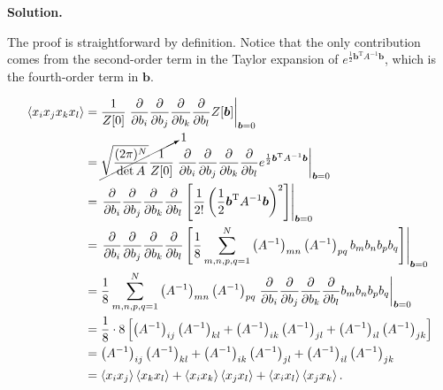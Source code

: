 \documentclass[11pt,a4paper]{article}
\newcounter{problem}
\newcounter{saveequation}
\newenvironment{solution}
{
	\par
	\setcounter{saveequation}{\value{equation}}
	\begingroup
	\setcounter{equation}{0}
	\renewcommand{\theequation}{\arabic{problem}.\arabic{equation}}
	\renewcommand{\theHequation}{sol.\arabic{problem}.\arabic{equation}}
	\noindent\textbf{Solution.}\quad
}
{
	\par
	\endgroup
	\setcounter{equation}{\value{saveequation}}
}
\begin{document}
	\begin{solution}
		The proof is straightforward by definition. Notice that the only contribution comes from the second-order term in the Taylor expansion of 
		$e^{\frac12 \boldsymbol{b}^\mathrm{T} A^{-1} \boldsymbol{b}}$, which is the fourth-order term in $\boldsymbol{b}$.
	\begin{finalanswer}
				\begin{equation}
				\label{fin:4}
				\begin{aligned}
					\braket{x_ix_jx_kx_l}
					&=\frac{1}{Z[0]}
					\left.
					\frac{\partial}{\partial b_i}
					\frac{\partial}{\partial b_j}
					\frac{\partial}{\partial b_k}
					\frac{\partial}{\partial b_l}
					Z[\boldsymbol{b}]
					\right|_{\boldsymbol{b}=0}\\
					&=\cancelto{1}{\sqrt{\frac{(2\pi)^N}{\det A}}\frac{1}{Z[0]}}
					\left.
					\frac{\partial}{\partial b_i}
					\frac{\partial}{\partial b_j}
					\frac{\partial}{\partial b_k}
					\frac{\partial}{\partial b_l}
					e^{\frac12 \boldsymbol{b}^{\mathrm T}A^{-1}\boldsymbol{b}}
					\right|_{\boldsymbol{b}=0}\\
					&=
					\left.
					\frac{\partial}{\partial b_i}
					\frac{\partial}{\partial b_j}
					\frac{\partial}{\partial b_k}
					\frac{\partial}{\partial b_l}
					\left[
					\frac{1}{2!}
					\left(
					\frac12 \boldsymbol{b}^{\mathrm T}A^{-1}\boldsymbol{b}
					\right)^2
					\right]
					\right|_{\boldsymbol{b}=0}\\
					&=
					\left.
					\frac{\partial}{\partial b_i}
					\frac{\partial}{\partial b_j}
					\frac{\partial}{\partial b_k}
					\frac{\partial}{\partial b_l}
					\left[
					\frac18
					\sum_{m,n,p,q=1}^{N}
					\left(A^{-1}\right)_{mn}
					\left(A^{-1}\right)_{pq}
					b_m b_n b_p b_q
					\right]
					\right|_{\boldsymbol{b}=0}\\
					&=
					\frac18
					\sum_{m,n,p,q=1}^{N}
					\left(A^{-1}\right)_{mn}
					\left(A^{-1}\right)_{pq}
					\left.
					\frac{\partial}{\partial b_i}
					\frac{\partial}{\partial b_j}
					\frac{\partial}{\partial b_k}
					\frac{\partial}{\partial b_l}
					b_m b_n b_p b_q
					\right|_{\boldsymbol{b}=0}\\
					&=
					\frac18\cdot 8
					\left[
					\left(A^{-1}\right)_{ij}\left(A^{-1}\right)_{kl}
					+
					\left(A^{-1}\right)_{ik}\left(A^{-1}\right)_{jl}
					+
					\left(A^{-1}\right)_{il}\left(A^{-1}\right)_{jk}
					\right]\\
					&=
					\left(A^{-1}\right)_{ij}\left(A^{-1}\right)_{kl}
					+
					\left(A^{-1}\right)_{ik}\left(A^{-1}\right)_{jl}
					+
					\left(A^{-1}\right)_{il}\left(A^{-1}\right)_{jk}\\
					&=
					\braket{x_ix_j}\braket{x_kx_l}
					+
					\braket{x_ix_k}\braket{x_jx_l}
					+
					\braket{x_ix_l}\braket{x_jx_k}.
				\end{aligned}
			\end{equation}
	\end{finalanswer}
	\end{solution}
	
\end{document}
